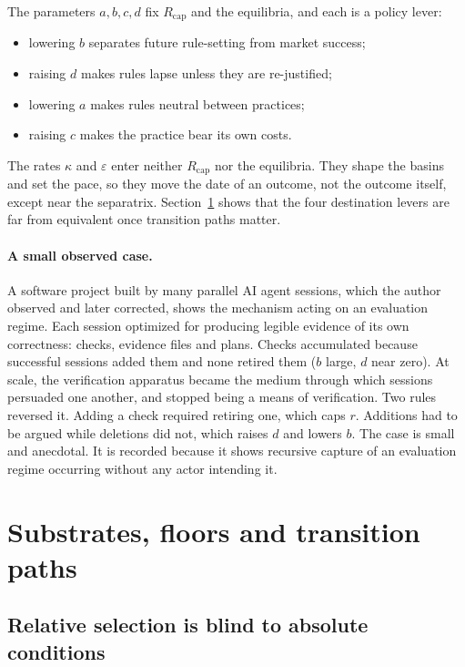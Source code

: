 \documentclass[11pt]{article}
\theoremstyle{plain}
\theoremstyle{definition}
\newcommand{\Rcap}{R_{\mathrm{cap}}}
\begin{document}
The parameters $a,b,c,d$ fix $\Rcap$ and the equilibria, and each is a policy lever:
\begin{itemize}[leftmargin=*]
\item lowering $b$ separates future rule-setting from market success;
\item raising $d$ makes rules lapse unless they are re-justified;
\item lowering $a$ makes rules neutral between practices;
\item raising $c$ makes the practice bear its own costs.
\end{itemize}
The rates $\kappa$ and $\varepsilon$ enter neither $\Rcap$ nor the equilibria. They shape the basins and set the pace, so they move the date of an outcome, not the outcome itself, except near the separatrix. Section~\ref{sec:substrate} shows that the four destination levers are far from equivalent once transition paths matter.

\paragraph{A small observed case.} A software project built by many parallel AI agent sessions, which the author observed and later corrected, shows the mechanism acting on an evaluation regime. Each session optimized for producing legible evidence of its own correctness: checks, evidence files and plans. Checks accumulated because successful sessions added them and none retired them ($b$ large, $d$ near zero). At scale, the verification apparatus became the medium through which sessions persuaded one another, and stopped being a means of verification. Two rules reversed it. Adding a check required retiring one, which caps $r$. Additions had to be argued while deletions did not, which raises $d$ and lowers $b$. The case is small and anecdotal. It is recorded because it shows recursive capture of an evaluation regime occurring without any actor intending it.

\section{Substrates, floors and transition paths}\label{sec:substrate}

\subsection{Relative selection is blind to absolute conditions}
\end{document}
